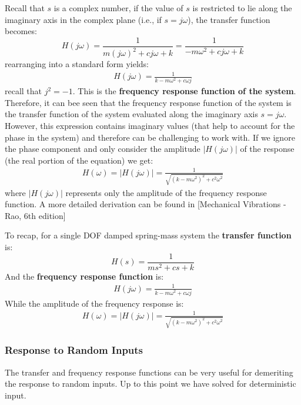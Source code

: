 \documentclass[12pt,letter]{article}
\numberwithin{ex}{section} %
\begin{document}
Recall that $s$ is a complex number, if the value of $s$ is restricted to lie along the imaginary axis in the complex plane (i.e., if $s = j\omega$), the transfer function becomes:
\begin{equation}
H(j\omega) = \frac{1}{m(j\omega)^2+cj\omega+k} = \frac{1}{-m\omega^2+cj\omega+k} 
\end{equation}
rearranging into a standard form yields:
\begin{eqnarray}
H(j\omega) = \frac{1}{k-m\omega^2+c\omega j}
\end{eqnarray}
recall that $j^2=-1$. This is the \textbf{frequency response function of the system}. Therefore, it can bee seen that the frequency response function of the system is the transfer function of the system evaluated along the imaginary axis $s=j\omega$. However, this expression contains imaginary values (that help to account for the phase in the system) and therefore can be challenging to work with. If we ignore the phase component and only consider the amplitude $|H(j\omega)|$ of the response (the real portion of the equation) we get:
\begin{eqnarray}
H(\omega) = |H(j\omega)| = \frac{1}{\sqrt{(k-m\omega^2)^2+c^2\omega^2}}
\end{eqnarray}
where $|H(j\omega)|$ represents only the amplitude of the frequency response function. A more detailed derivation can be found in [Mechanical Vibrations - Rao, 6th edition]



To recap, for a single DOF damped spring-mass system the \textbf{transfer function} is:
\begin{equation}
H(s) = \frac{1}{ms^2+cs+k}
\end{equation}
And the \textbf{frequency response function} is:
\begin{eqnarray}
H(j\omega) = \frac{1}{k-m\omega^2+c\omega j}
\end{eqnarray}
While the amplitude of the frequency response is:
\begin{eqnarray}
H(\omega) = |H(j\omega)| = \frac{1}{\sqrt{(k-m\omega^2)^2+c^2\omega^2}}
\end{eqnarray}




\subsubsection{Response to Random Inputs}
The transfer and frequency response functions can be very useful for demeriting the response to random inputs. Up to this point we have solved for deterministic input. 
\end{document}
